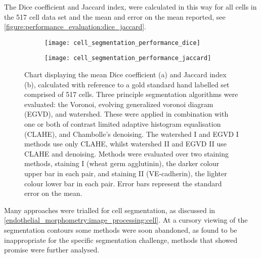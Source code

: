 The Dice coefficient and Jaccard index, were calculated in this way for all cells in the 517 cell data set and the mean and error on the mean reported, see \autoref{figure:performance_evaluation:dice_jaccard}.
\begin{figure}[htbp!]
	\begin{subfigure}[b]{\linewidth}
		\centering
		\texttt{[image: cell\_segmentation\_performance\_dice]}
		\caption{}
		\label{figure:performance_evaluation:dice_jaccard:dice}
		\vspace{1ex}
	\end{subfigure}
	\begin{subfigure}[b]{\linewidth}
		\centering
		\texttt{[image: cell\_segmentation\_performance\_jaccard]}
		\caption{}
		\label{figure:performance_evaluation:dice_jaccard:jaccard}
		\vspace{1ex}
	\end{subfigure}
\caption[Cell segmentation overlap ratio measures - Dice and Jaccard]{Chart displaying the mean Dice coefficient (a) and Jaccard index (b), calculated with reference to a gold standard hand labelled set comprised of 517 cells. Three principle segmentation algorithms were evaluated: the Voronoi, evolving generalized voronoi diagram (EGVD), and watershed. These were applied in combination with one or both of contrast limited adaptive histogram equalisation (CLAHE), and Chambolle's denoising. The watershed I and EGVD I methods use only CLAHE, whilst watershed II and EGVD II use CLAHE and denoising. Methods were evaluated over two staining methods, staining I (wheat germ agglutinin), the darker colour upper bar in each pair, and staining II (VE-cadherin), the lighter colour lower bar in each pair. Error bars represent the standard error on the mean.}
\label{figure:performance_evaluation:dice_jaccard}
\end{figure}

Many approaches were trialled for cell segmentation, as discussed in \autoref{endothelial_morphometry:image_processing:cell}. At a cursory viewing of the segmentation contours some methods were soon abandoned, as found to be inappropriate for the specific segmentation challenge, methods that showed promise were further analysed.

